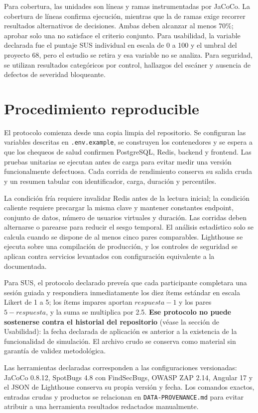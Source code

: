 \documentclass[11pt,a4paper]{report}
\begin{document}
Para cobertura, las unidades son líneas y ramas instrumentadas por JaCoCo. La cobertura de líneas confirma ejecución, mientras que la de ramas exige recorrer resultados alternativos de decisiones. Ambas deben alcanzar al menos 70\%; aprobar solo una no satisface el criterio conjunto. Para usabilidad, la variable declarada fue el puntaje SUS individual en escala de 0 a 100 y el umbral del proyecto 68, pero el estudio se retira y esa variable no se analiza. Para seguridad, se utilizan resultados categóricos por control, hallazgos del escáner y ausencia de defectos de severidad bloqueante.

\section{Procedimiento reproducible}
El protocolo comienza desde una copia limpia del repositorio. Se configuran las variables descritas en \texttt{.env.example}, se construyen los contenedores y se espera a que los chequeos de salud confirmen PostgreSQL, Redis, backend y frontend. Las pruebas unitarias se ejecutan antes de carga para evitar medir una versión funcionalmente defectuosa. Cada corrida de rendimiento conserva su salida cruda y un resumen tabular con identificador, carga, duración y percentiles.

La condición fría requiere invalidar Redis antes de la lectura inicial; la condición caliente requiere precargar la misma clave y mantener constantes endpoint, conjunto de datos, número de usuarios virtuales y duración. Las corridas deben alternarse o parearse para reducir el sesgo temporal. El análisis estadístico solo se calcula cuando se dispone de al menos cinco pares comparables. Lighthouse se ejecuta sobre una compilación de producción, y los controles de seguridad se aplican contra servicios levantados con configuración equivalente a la documentada.

Para SUS, el protocolo declarado preveía que cada participante completara una sesión guiada y respondiera inmediatamente los diez ítems estándar en escala Likert de 1 a 5; los ítems impares aportan $respuesta-1$ y los pares $5-respuesta$, y la suma se multiplica por 2.5. \textbf{Ese protocolo no puede sostenerse contra el historial del repositorio} (véase la sección de Usabilidad): la fecha declarada de aplicación es anterior a la existencia de la funcionalidad de simulación. El archivo crudo se conserva como material sin garantía de validez metodológica.

Las herramientas declaradas corresponden a las configuraciones versionadas: JaCoCo 0.8.12, SpotBugs 4.8 con FindSecBugs, OWASP ZAP 2.14, Angular 17 y el JSON de Lighthouse conserva su propia versión y fecha. Los comandos exactos, entradas crudas y productos se relacionan en \texttt{DATA-PROVENANCE.md} para evitar atribuir a una herramienta resultados redactados manualmente.
\end{document}
